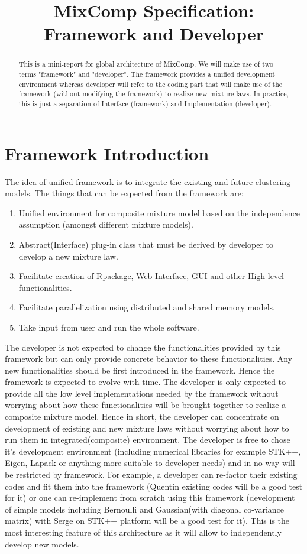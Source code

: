 \documentclass[a4paper,11pt]{article}
\title{MixComp Specification: Framework and Developer}
\begin{document}
\maketitle
\tableofcontents

\begin{abstract}
This is a mini-report for global architecture of MixComp. We will make use of two terms
"framework" and "developer". The framework provides a unified development
environment whereas developer will refer to the coding part that will make use of
the framework (without modifying the framework) to realize new mixture laws. In
practice, this is just a separation of Interface (framework) and Implementation (developer). 
\end{abstract}
\section{Framework Introduction}
The idea of unified framework is to integrate the existing and future clustering models.
The things that can be expected from the framework are:
\begin{enumerate}
\item Unified environment for composite mixture model based on the independence assumption (amongst different mixture models).
\item Abstract(Interface) plug-in class that must be derived by developer to develop a
new mixture law.
\item Facilitate creation of Rpackage, Web Interface, GUI and other High level functionalities.
\item Facilitate parallelization using distributed and shared memory models.
\item Take input from user and run the whole software.
\end{enumerate}

The developer is not expected to change the functionalities provided by this framework
but can only provide concrete behavior to these functionalities. Any new functionalities
should be first introduced in the framework. Hence the framework is expected to evolve
with time. The developer is only expected to provide all the low level implementations
needed by the framework without worrying about how these functionalities will be
brought together to realize a composite mixture model. Hence in short, the developer
can concentrate on development of existing and new mixture laws without worrying
about how to run them in integrated(composite) environment. The developer is free
to chose it's development environment (including numerical libraries for example
STK++, Eigen, Lapack or anything more suitable to developer needs) and in no way
will be restricted by framework. For example, a developer can re-factor their
existing codes and fit them into the framework (Quentin existing codes will be
a good test for it) or one can re-implement from scratch  using this framework
(development of simple models including Bernoulli and Gaussian(with diagonal
co-variance matrix) with Serge on STK++ platform will be a good test for it).
This is the most interesting feature of this architecture as it will allow to
independently develop new models.
\end{document}
